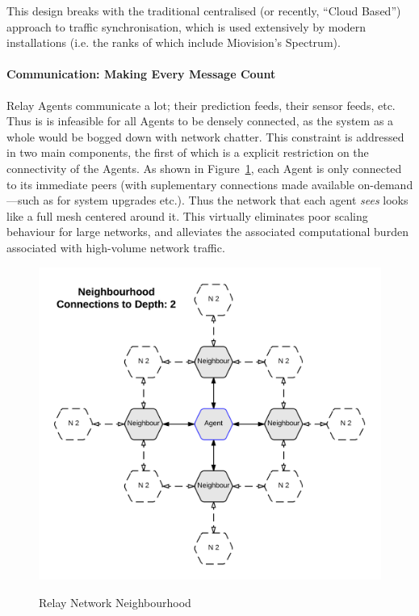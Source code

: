 \documentclass{report}
\begin{document}
This design breaks with the traditional centralised (or recently, ``Cloud Based'') approach to traffic synchronisation, which is used extensively by modern installations (i.e. the ranks of which include Miovision's Spectrum).

\paragraph{Communication: Making Every Message Count}
Relay Agents communicate a lot; their prediction feeds, their sensor feeds, etc.
Thus is is infeasible for all Agents to be densely connected, as the system as a whole would be bogged down with network chatter.
This constraint is addressed in two main components, the first of which is a explicit restriction on the connectivity of the Agents.
As shown in Figure~\ref{fig:Relay_Network}, each Agent is only connected to its immediate peers (with suplementary connections made available on-demand---such as for system upgrades etc.).
Thus the network that each agent \emph{sees} looks like a full mesh centered around it.
This virtually eliminates poor scaling behaviour for large networks, and alleviates the associated computational burden associated with high-volume network traffic.

\begin{figure}[!htpb]
	\caption{Relay Network Neighbourhood}
	\includegraphics[width=\textwidth]{figures/Relay_Network.png}
	\label{fig:Relay_Network}
\end{figure}
\end{document}
